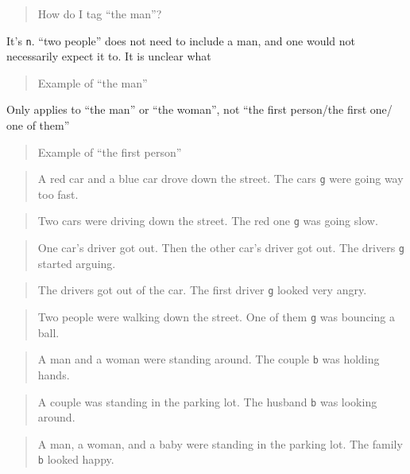 \documentclass[
]{book}
\begin{document}
\begin{quote}
How do I tag ``the man''?
\end{quote}

It's \texttt{n}.
``two people'' does not need to include a man, and one would not necessarily
expect it to.
It is unclear what

\begin{quote}
Example of ``the man''
\end{quote}

Only applies to ``the man'' or ``the woman'', not ``the first person/the first one/ one of them''

\begin{quote}
Example of ``the first person''
\end{quote}

\begin{quote}
A red car and a blue car drove down the street.
The cars \texttt{g} were going way too fast.
\end{quote}

\begin{quote}
Two cars were driving down the street.
The red one \texttt{g} was going slow.
\end{quote}

\begin{quote}
One car's driver got out.
Then the other car's driver got out.
The drivers \texttt{g} started arguing.
\end{quote}

\begin{quote}
The drivers got out of the car.
The first driver \texttt{g} looked very angry.
\end{quote}

\begin{quote}
Two people were walking down the street.
One of them \texttt{g} was bouncing a ball.
\end{quote}

\begin{quote}
A man and a woman were standing around.
The couple \texttt{b} was holding hands.
\end{quote}

\begin{quote}
A couple was standing in the parking lot.
The husband \texttt{b} was looking around.
\end{quote}

\begin{quote}
A man, a woman, and a baby were standing in the parking lot.
The family \texttt{b} looked happy.
\end{quote}
\end{document}
